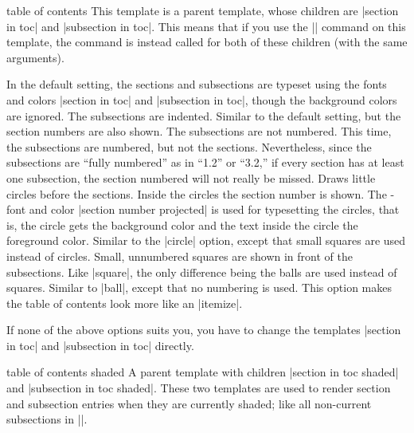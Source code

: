 \begin{command}{\tableofcontents{}}
  \begin{template*}{table of contents}
    This template is a parent template, whose children are
    |section in toc| and |subsection in toc|. This means that if you
    use the |\setbeamertemplate| command on this template, the command
    is instead called for both of these children (with the same arguments).

    \begin{templateoptions}
      In the default setting, the sections and subsections are typeset
      using the fonts and colors |section in toc| and
      |subsection in toc|, though the background colors are ignored. The
      subsections are indented.
      Similar to the default setting, but the section numbers are also
      shown. The subsections are not numbered.
      This time, the subsections are numbered, but not the
      sections. Nevertheless, since the subsections are ``fully
      numbered'' as in ``1.2'' or ``3.2,'' if every section has at least
      one subsection, the section numbered will not really be missed.
      Draws little circles before the sections. Inside
      the circles the section number is shown. The \beamer-font and
      color |section number projected| is used for typesetting the
      circles, that is, the circle gets the background color and the
      text inside the circle the foreground color.
      Similar to the |circle| option, except that small squares are
      used instead of circles. Small, unnumbered squares are shown in
      front of the subsections.
      Like |square|, the only difference being the balls are used
      instead of squares.
      Similar to |ball|, except that no numbering is used. This option
      makes the table of contents look more like an |itemize|.
    \end{templateoptions}

    If none of the above options suits you, you have to change the
    templates |section in toc| and |subsection in toc| directly.
  \end{template*}

  \begin{template}{table of contents shaded}
    A parent template with children
    |section in toc shaded| and |subsection in toc shaded|. These two
    templates are used to render section and subsection entries when
    they are currently shaded; like all non-current subsections in
    |\tableofcontents[currentsubsection]|. 


\end{template}
\end{command}
